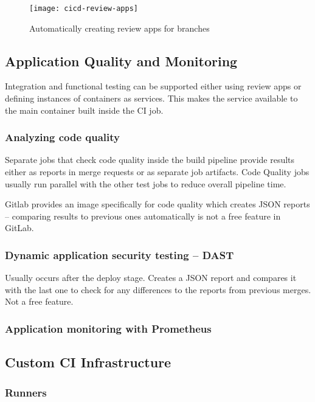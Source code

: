 \begin{figure}[h]
    \centering
    \texttt{[image: cicd-review-apps]}
    \caption{Automatically creating review apps for branches}
\end{figure}

\subsection{Application Quality and Monitoring}
Integration and functional testing can be supported either using review apps or defining instances of containers as services. This makes the service available to the 
main container built inside the CI job.

\subsubsection{Analyzing code quality}
Separate jobs that check code quality inside the build pipeline provide results either as reports in merge requests or as separate job artifacts.
Code Quality jobs usually run parallel with the other test jobs to reduce overall pipeline time. 

Gitlab provides an image specifically for code quality which creates JSON reports -- comparing results to previous ones automatically is not a free feature in GitLab.

\subsubsection{Dynamic application security testing -- DAST}
Usually occurs after the deploy stage. Creates a JSON report and compares it with the last one to check for any differences to the reports from previous merges. Not a free feature.

\subsubsection{Application monitoring with Prometheus}



\subsection{Custom CI Infrastructure}

\subsubsection{Runners}